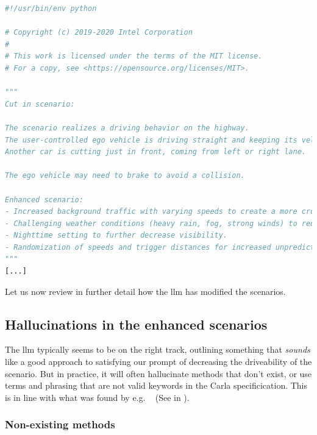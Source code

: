 \begin{lstlisting}[caption={Head of an \acrshort{llm}-enhanced scenario, highlighting how the \acrshort{llm} can add an explenation of how it enhanced the scenario.}, label={lst:llmOutputExplenation}, language={Python}]
#!/usr/bin/env python

# Copyright (c) 2019-2020 Intel Corporation
#
# This work is licensed under the terms of the MIT license.
# For a copy, see <https://opensource.org/licenses/MIT>.

"""
Cut in scenario:

The scenario realizes a driving behavior on the highway.
The user-controlled ego vehicle is driving straight and keeping its velocity at a constant level.
Another car is cutting just in front, coming from left or right lane.

The ego vehicle may need to brake to avoid a collision.

Enhanced scenario:
- Increased background traffic with varying speeds to create a more crowded environment.
- Challenging weather conditions (heavy rain, fog, strong winds) to reduce visibility and grip.
- Nighttime setting to further decrease visibility.
- Randomization of speeds and trigger distances for increased unpredictability.
"""
[...]
\end{lstlisting}

Let us now review in further detail how the \acrshort{llm} has modified the scenarios.

\subsection{Hallucinations in the enhanced scenarios}\label{sec:resultsHallucinations}

The \acrshort{llm} typically seems to be on the right track, outlining something
that \emph{sounds} like a good approach to satisfying our prompt of decreasing
the driveability of the scenario. But in practice, it will often hallucinate
methods that don't exist, or use terms and phrasing that are not valid keywords
in the Carla specificication. This is in line with what was found by e.g.
\citeauthor{autoSceneGen}~\cite[14542]{autoSceneGen} (See  in
).

\subsubsection{Non-existing methods}

